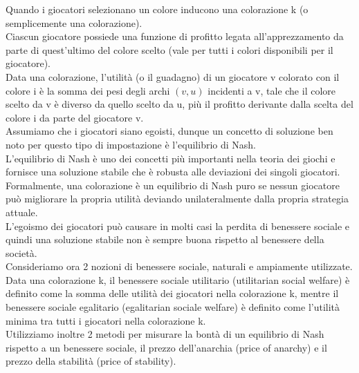 Quando i giocatori selezionano un colore inducono una colorazione k (o semplicemente una colorazione).\\

Ciascun giocatore possiede una funzione di profitto legata all'apprezzamento da parte di quest'ultimo del colore scelto (vale per tutti i colori disponibili per il giocatore).\\

Data una colorazione, l'utilità (o il guadagno) di un giocatore v colorato con il colore i è la somma dei pesi degli archi \((v, u)\) incidenti a v, tale che il colore scelto da v è diverso da quello scelto da u, più il profitto derivante dalla scelta del colore i da parte del giocatore v.\\

Assumiamo che i giocatori siano egoisti, dunque un concetto di soluzione ben noto per questo tipo di impostazione è l'equilibrio di Nash.\\

L'equilibrio di Nash è uno dei concetti più importanti nella teoria dei giochi e fornisce una soluzione stabile che è robusta alle deviazioni dei singoli giocatori.\\

Formalmente, una colorazione è un equilibrio di Nash puro se nessun giocatore può migliorare la propria utilità deviando unilateralmente dalla propria strategia attuale.\\

L'egoismo dei giocatori può causare in molti casi la perdita di benessere sociale e quindi una soluzione stabile non è sempre buona rispetto al benessere della società.\\

Consideriamo ora 2 nozioni di benessere sociale, naturali e ampiamente utilizzate.\\

Data una colorazione k, il benessere sociale utilitario (utilitarian social welfare) è definito come la somma delle utilità dei giocatori nella colorazione k, mentre il benessere sociale egalitario (egalitarian sociale welfare) è definito come l'utilità minima tra tutti i giocatori nella colorazione k.\\

Utilizziamo inoltre 2 metodi per misurare la bontà di un equilibrio di Nash rispetto a un benessere sociale, il prezzo dell'anarchia (price of anarchy) e il prezzo della stabilità (price of stability).\\

